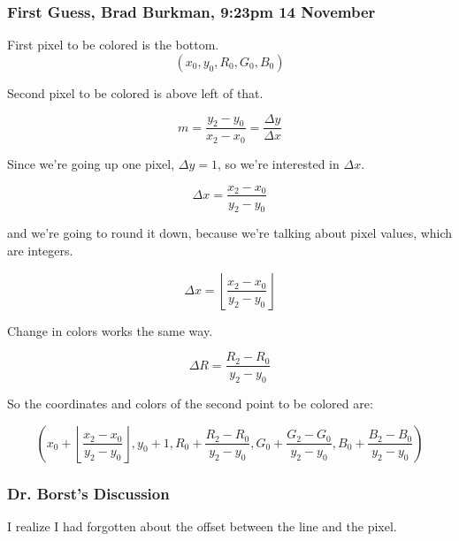 \documentclass[11pt]{article}
\begin{document}
\begin{spacing}{1.2}
\subsubsection{First Guess, Brad Burkman, 9:23pm 14 November}

First pixel to be colored is the bottom.  
$$(x_0, y_0, R_0, G_0, B_0)$$

Second pixel to be colored is above left of that.  

$$m = \frac{y_2 - y_0}{x_2 - x_0} = \frac{\Delta y}{\Delta x}$$

Since we're going up one pixel, $\Delta y = 1$, so we're interested in $\Delta x$.  

$$\Delta x = \frac{x_2 - x_0}{y_2 - y_0}$$

and we're going to round it down, because we're talking about pixel values, which are integers.  

$$\Delta x = \left\lfloor\frac{x_2 - x_0}{y_2 - y_0}\right\rfloor$$

Change in colors works the same way.  

$$\Delta R = \frac{R_2 - R_0}{y_2 - y_0}$$

So the coordinates and colors of the second point to be colored are:

$$\left( x_0 + \left\lfloor\frac{x_2 - x_0}{y_2 - y_0}\right\rfloor, 
y_0 + 1, 
R_0 + \frac{R_2 - R_0}{y_2 - y_0},
G_0 + \frac{G_2 - G_0}{y_2 - y_0},
B_0 + \frac{B_2 - B_0}{y_2 - y_0}
\right)$$

\subsubsection{Dr. Borst's Discussion}

I realize I had forgotten about the offset between the line and the pixel.  

\end{spacing}
\end{document}
